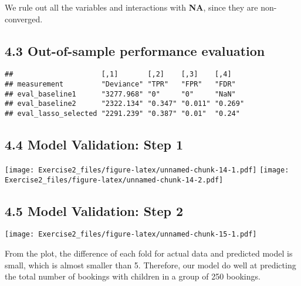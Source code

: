 \documentclass[
]{article}
\begin{document}
We rule out all the variables and interactions with \textbf{NA}, since
they are non-converged.

\hypertarget{out-of-sample-performance-evaluation}{%
\subsection{4.3 Out-of-sample performance
evaluation}\label{out-of-sample-performance-evaluation}}

\begin{verbatim}
##                     [,1]       [,2]    [,3]    [,4]   
## measurement         "Deviance" "TPR"   "FPR"   "FDR"  
## eval_baseline1      "3277.968" "0"     "0"     "NaN"  
## eval_baseline2      "2322.134" "0.347" "0.011" "0.269"
## eval_lasso_selected "2291.239" "0.387" "0.01"  "0.24"
\end{verbatim}

\hypertarget{model-validation-step-1}{%
\subsection{4.4 Model Validation: Step
1}\label{model-validation-step-1}}

\texttt{[image: Exercise2\_files/figure-latex/unnamed-chunk-14-1.pdf]}
\texttt{[image: Exercise2\_files/figure-latex/unnamed-chunk-14-2.pdf]}

\hypertarget{model-validation-step-2}{%
\subsection{4.5 Model Validation: Step
2}\label{model-validation-step-2}}

\texttt{[image: Exercise2\_files/figure-latex/unnamed-chunk-15-1.pdf]}

From the plot, the difference of each fold for actual data and predicted
model is small, which is almost smaller than 5. Therefore, our model do
well at predicting the total number of bookings with children in a group
of 250 bookings.
\end{document}
